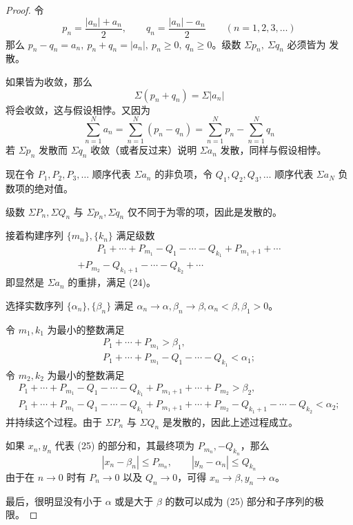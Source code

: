 \documentclass[../poma-notes.tex]{subfiles}
\begin{document}
\begin{proof}
  令
  \[
    p_n = \frac{|a_n|+a_n}{2},\qquad q_n = \frac{|a_n|-a_n}{2} \qquad (n=1,2,3,\dots)
  \]
  那么 $p_n - q_n = a_n,\ p_n + q_n = |a_n|,\ p_n \ge 0,\ q_n \ge 0$。级数 $\Sigma p_n,\ \Sigma q_n$ 必须皆为
  发散。

  如果皆为收敛，那么
  \[
    \Sigma(p_n + q_n) = \Sigma |a_n|
  \]
  将会收敛，这与假设相悖。又因为
  \[
    \sum_{n=1}^{N} a_n = \sum_{n=1}^{N} (p_n - q_n) = \sum_{n=1}^{N} p_n - \sum_{n=1}^{N} q_n
  \]
  若 $\Sigma p_n$ 发散而 $\Sigma q_n$ 收敛（或者反过来）说明 $\Sigma a_n$ 发散，同样与假设相悖。

  现在令 $P_1,P_2,P_3,\dots$ 顺序代表 $\Sigma a_n$ 的非负项，令 $Q_1,Q_2,Q_3,\dots$ 顺序代表 $\Sigma a_N$
  负数项的绝对值。

  级数 $\Sigma P_n, \Sigma Q_n$ 与 $\Sigma p_n, \Sigma q_n$ 仅不同于为零的项，因此是发散的。

  接着构建序列 $\{m_n\}, \{k_n\}$ 满足级数
  \begin{multline}
    \qquad P_1 + \cdots + P_{m_1} - Q_1 - \cdots - Q_{k_1} + P_{m_1 + 1} + \cdots \\
    + P_{m_2} - Q_{k_1 + 1} - \cdots - Q_{k_2} + \cdots \qquad
  \end{multline}
  即显然是 $\Sigma a_n$ 的重排，满足 (24)。

  选择实数序列 $\{\alpha_n\},\{\beta_n\}$ 满足 $\alpha_n\to\alpha, \beta_n\to\beta, \alpha_n<\beta, \beta_1>0$。

  令 $m_1, k_1$ 为最小的整数满足
  \begin{gather*}
    P_1 + \cdots + P_{m_1} > \beta_1, \\
    P_1 + \cdots + P_{m_1} - Q_1 - \cdots - Q_{k_1} < \alpha_1;
  \end{gather*}
  令 $m_2, k_2$ 为最小的整数满足
  \begin{gather*}
    P_1 + \cdots + P_{m_1} - Q_1 - \cdots - Q_{k_1} + P_{m_1+1} + \cdots + P_{m_2} > \beta_2, \\
    P_1 + \cdots + P_{m_1} - Q_1 - \cdots - Q_{k_1} + P_{m_1+1} + \cdots + P_{m_2} - Q_{k_1+1} -
    \cdots - Q_{k_2} < \alpha_2;
  \end{gather*}
  并持续这个过程。由于 $\Sigma P_n$ 与 $\Sigma Q_n$ 是发散的，因此上述过程成立。

  如果 $x_n, y_n$ 代表 (25) 的部分和，其最终项为 $P_{m_n}, -Q_{k_n}$，那么
  \[
    |x_n - \beta_n| \le P_{m_n},\qquad |y_n - \alpha_n| \le Q_{k_n}
  \]
  由于在 $n \to 0$ 时有 $P_n \to 0$ 以及 $Q_n \to 0$，可得 $x_n \to \beta, y_n \to \alpha$。

  最后，很明显没有小于 $\alpha$ 或是大于 $\beta$ 的数可以成为 (25) 部分和子序列的极限。
\end{proof}
\end{document}
